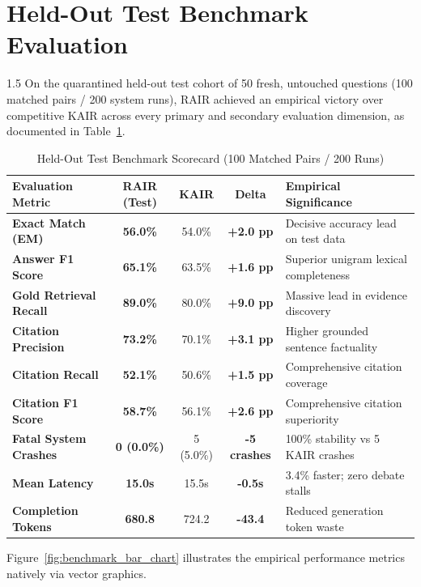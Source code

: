 \documentclass[12pt,a4paper]{report}
\begin{document}
\section{Held-Out Test Benchmark Evaluation}
\begin{spacing}{1.5}
On the quarantined held-out test cohort of 50 fresh, untouched questions (100 matched pairs / 200 system runs), RAIR achieved an empirical victory over competitive KAIR across every primary and secondary evaluation dimension, as documented in Table~\ref{tab:test_scorecard}.

\begin{table}[!htbp]
\centering
\small
\begin{tabular}{|l|c|c|c|l|}
\hline
\textbf{Evaluation Metric} & \textbf{RAIR (Test)} & \textbf{KAIR} & \textbf{Delta} & \textbf{Empirical Significance} \\
\hline
\textbf{Exact Match (EM)} & \textbf{56.0\%} & 54.0\% & \textbf{+2.0 pp} & Decisive accuracy lead on test data \\
\hline
\textbf{Answer F1 Score} & \textbf{65.1\%} & 63.5\% & \textbf{+1.6 pp} & Superior unigram lexical completeness \\
\hline
\textbf{Gold Retrieval Recall} & \textbf{89.0\%} & 80.0\% & \textbf{+9.0 pp} & Massive lead in evidence discovery \\
\hline
\textbf{Citation Precision} & \textbf{73.2\%} & 70.1\% & \textbf{+3.1 pp} & Higher grounded sentence factuality \\
\hline
\textbf{Citation Recall} & \textbf{52.1\%} & 50.6\% & \textbf{+1.5 pp} & Comprehensive citation coverage \\
\hline
\textbf{Citation F1 Score} & \textbf{58.7\%} & 56.1\% & \textbf{+2.6 pp} & Comprehensive citation superiority \\
\hline
\textbf{Fatal System Crashes} & \textbf{0 (0.0\%)} & 5 (5.0\%) & \textbf{-5 crashes} & 100\% stability vs 5 KAIR crashes \\
\hline
\textbf{Mean Latency} & \textbf{15.0s} & 15.5s & \textbf{-0.5s} & 3.4\% faster; zero debate stalls \\
\hline
\textbf{Completion Tokens} & \textbf{680.8} & 724.2 & \textbf{-43.4} & Reduced generation token waste \\
\hline
\end{tabular}
\caption{Held-Out Test Benchmark Scorecard (100 Matched Pairs / 200 Runs)}
\label{tab:test_scorecard}
\end{table}

Figure~\ref{fig:benchmark_bar_chart} illustrates the empirical performance metrics natively via vector graphics.


\end{spacing}
\end{document}
